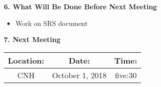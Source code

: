 \documentclass[12pt]{article}
\begin{document}
\begin{flushleft}
\textbf{6. What Will Be Done Before Next Meeting}\\
\begin{itemize}
\item Work on SRS document\\
\end{itemize}

\textbf{7. Next Meeting}\\
\begin{center}
 \begin{tabular}{|c | c | c |} 
\hline
 Location: & Date: & Time: \\ 
 \hline
 CNH & October 1, 2018 & five:30\\
\hline
\end{tabular}
\end{center}

\end{flushleft}
\end{document}
